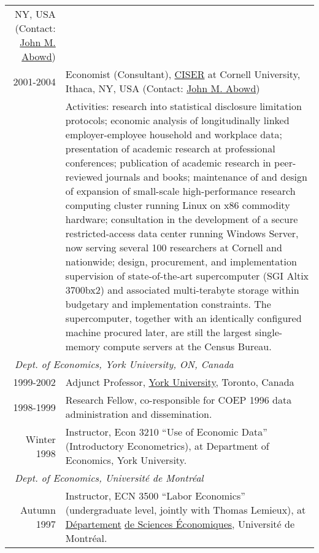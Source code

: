 \documentclass[10pt,letterpaper]{report}
\begin{document}
\begin{longtable}{rp{5in}}
NY, USA (Contact:
\href{mailto:john_abowd@cornell.edu}{John M. Abowd})\\%
2001-2004    & Economist (Consultant), 
\href{http://www.ciser.cornell.edu}{CISER} at Cornell University, Ithaca,
NY, USA (Contact:
\href{mailto:john_abowd@cornell.edu}{John M. Abowd})\\[.3cm]
         &Activities: research into statistical
         disclosure limitation protocols; economic analysis of
         longitudinally linked employer-employee household and workplace
         data; presentation of academic research at professional
         conferences; publication of academic research in peer-reviewed
         journals and books; maintenance of and design of expansion of small-scale high-performance
         research computing cluster running Linux on x86 commodity
         hardware; consultation in the development of a secure
         restricted-access data center running Windows Server, now serving
         several 100 researchers at Cornell and nationwide; design,
         procurement, and implementation supervision of state-of-the-art
         supercomputer (SGI Altix 3700bx2) and associated multi-terabyte
         storage within budgetary and implementation constraints. The
         supercomputer, together with an identically configured machine
         procured later, are still the largest single-memory compute
         servers at the Census Bureau.\\


\multicolumn{2}{l}{\ \it Dept. of Economics, York University, ON, Canada}\\
1999-2002    &Adjunct Professor, \href{http://econ.yorku.ca}{York University}, Toronto, Canada\\
1998-1999       &Research Fellow, co-responsible for COEP 1996 data administration and dissemination. \\

Winter 1998     &Instructor, Econ 3210 ``Use of Economic Data''
(Introductory Econometrics), at Department of Economics, York University. 
\\%
\multicolumn{2}{l}{\ \it Dept. of Economics, Universit\'e de Montr\'eal}\\

Autumn 1997     &Instructor, ECN 3500 ``Labor Economics'' (undergraduate level, jointly
with Thomas Lemieux), at 
  \href{http://http://www.sceco.umontreal.ca/}{D\'epartement} 
  \href{http://http://www.sceco.umontreal.ca/}{de Sciences \'Economiques}, Universit\'e de
Montr\'eal. 
\\


\end{longtable}
\end{document}
